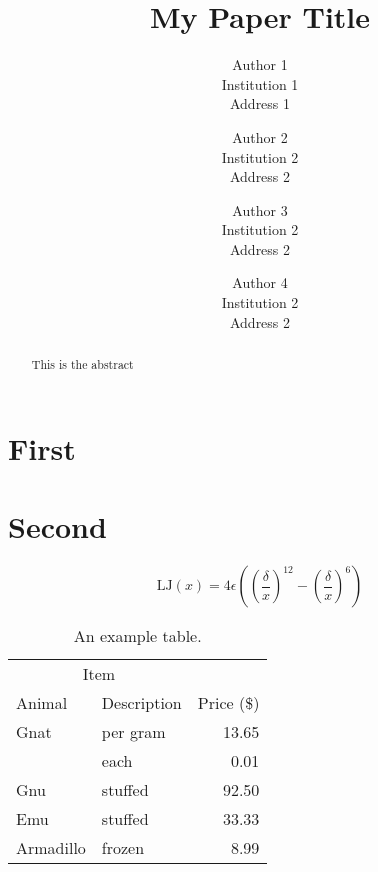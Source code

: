 \documentclass{nestpaper}
\title{My Paper Title}
\author{
  Author 1\\
  Institution 1 \\
  Address 1 \\
  \email{author1@institution1.edu}
  \and
  Author 2\\
  Institution 2 \\
  Address 2 \\
  \email{author2@institution2.edu}
  \and
  Author 3\\
  Institution 2 \\
  Address 2 \\
  \email{author2@institution2.edu}
  \and
  Author 4\\
  Institution 2 \\
  Address 2 \\
  \email{author2@institution2.edu}}
\begin{document}
\maketitle

\begin{abstract}
    This is the abstract
\end{abstract}

\section{First}
\lipsum[1-8]

\section{Second}
\lipsum[9]
\begin{equation}
  \text{LJ}(x) = 4\epsilon\left(\left(\frac{\delta}{x}\right)^{12} - \left(\frac{\delta}{x}\right)^6\right)
\end{equation}

\lipsum[10]

\begin{table}[t]
  \centering
  \caption{An example table.}
  \begin{tabular}{@{}llr@{}}
    \toprule
    \multicolumn{2}{c}{Item} \\
    \cmidrule(r){1-2}
    Animal    & Description & Price (\$)\\
    \midrule
    Gnat      & per gram    & 13.65     \\
              & each        & 0.01      \\
    Gnu       & stuffed     & 92.50     \\
    Emu       & stuffed     & 33.33     \\
    Armadillo & frozen      & 8.99      \\
    \bottomrule
  \end{tabular}
\end{table}
\end{document}
